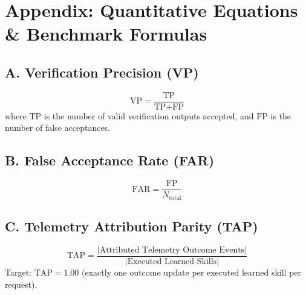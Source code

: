 \section*{Appendix: Quantitative Equations \& Benchmark Formulas}

\subsection*{A. Verification Precision (VP)}
\begin{equation}
\text{VP} = \frac{\text{TP}}{\text{TP} + \text{FP}}
\end{equation}
where $\text{TP}$ is the number of valid verification outputs accepted, and $\text{FP}$ is the number of false acceptances.

\subsection*{B. False Acceptance Rate (FAR)}
\begin{equation}
\text{FAR} = \frac{\text{FP}}{N_{\text{total}}}
\end{equation}

\subsection*{C. Telemetry Attribution Parity (TAP)}
\begin{equation}
\text{TAP} = \frac{|\text{Attributed Telemetry Outcome Events}|}{|\text{Executed Learned Skills}|}
\end{equation}
Target: $\text{TAP} = 1.00$ (exactly one outcome update per executed learned skill per request).

